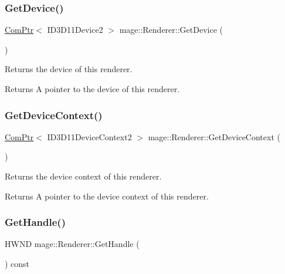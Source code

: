 \subsubsection{\texorpdfstring{Get\+Device()}{GetDevice()}}
{\footnotesize\ttfamily \hyperlink{namespacemage_ae74f374780900893caa5555d1031fd79}{Com\+Ptr}$<$ I\+D3\+D11\+Device2 $>$ mage\+::\+Renderer\+::\+Get\+Device (\begin{DoxyParamCaption}{ }\end{DoxyParamCaption})}

Returns the device of this renderer.

\begin{DoxyReturn}{Returns}
A pointer to the device of this renderer. 
\end{DoxyReturn}
\hypertarget{classmage_1_1_renderer_a9c0c9254fb8295e415c80fff8de99f82}{}\label{classmage_1_1_renderer_a9c0c9254fb8295e415c80fff8de99f82} 
\subsubsection{\texorpdfstring{Get\+Device\+Context()}{GetDeviceContext()}}
{\footnotesize\ttfamily \hyperlink{namespacemage_ae74f374780900893caa5555d1031fd79}{Com\+Ptr}$<$ I\+D3\+D11\+Device\+Context2 $>$ mage\+::\+Renderer\+::\+Get\+Device\+Context (\begin{DoxyParamCaption}{ }\end{DoxyParamCaption})}

Returns the device context of this renderer.

\begin{DoxyReturn}{Returns}
A pointer to the device context of this renderer. 
\end{DoxyReturn}
\hypertarget{classmage_1_1_renderer_a11d47495a47c58a0f67aae3110f9f519}{}\label{classmage_1_1_renderer_a11d47495a47c58a0f67aae3110f9f519} 
\subsubsection{\texorpdfstring{Get\+Handle()}{GetHandle()}}
{\footnotesize\ttfamily H\+W\+ND mage\+::\+Renderer\+::\+Get\+Handle (\begin{DoxyParamCaption}{ }\end{DoxyParamCaption}) const}

